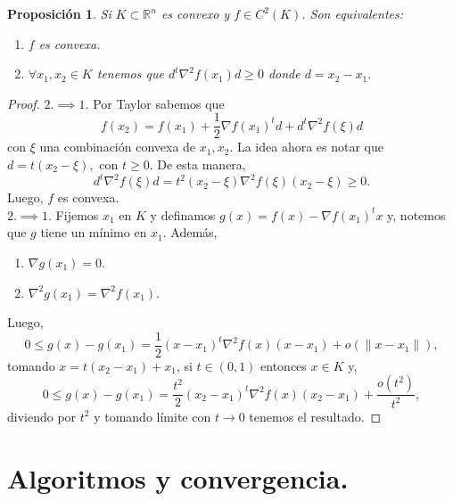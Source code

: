 \documentclass[11pt]{article}
\theoremstyle{ejstyle}
\theoremstyle{ejstyle}
\theoremstyle{ejstyle}
\theoremstyle{ejstyle}
\theoremstyle{ejstyle}
\newtheorem{prop}{Proposición}
\theoremstyle{ejstyle}
\theoremstyle{ejstyle}
\begin{document}
 	\begin{prop}
 		Si $K \subset \mathbb{R}^{n}$ es convexo y $f \in C^{2}(K)$. Son equivalentes:
 		\begin{enumerate}
 			\item $f$ es convexa.
 			\item $\forall x_1, x_2 \in K$ tenemos que $d^{t}\nabla^{2}f(x_1)d \geq 0$ donde $d = x_2 - x_1.$
 		\end{enumerate}
 	\end{prop}
 	
 	\begin{proof}
 		$2. \implies 1.$  Por Taylor sabemos que
 		$$
 		f(x_2) = f(x_1) + \frac{1}{2} \nabla f(x_1)^{t}d +d^{t}\nabla^2 f(\xi)d 
 		$$
 		con $\xi$ una combinación convexa de $x_1, x_2$. La idea ahora es notar que $d = t(x_2 - \xi),$ con $t \geq 0.$ De esta manera,
 		$$
 		d^{t}\nabla^2 f(\xi)d = t^{2} (x_2- \xi)\nabla^2 f(\xi)(x_2 - \xi) \geq 0.
 		$$ 
 		Luego, $f$ es convexa. \\
 		
 		$2. \implies 1.$  Fijemos $x_1$ en $K$ y definamos $g(x) = f(x) - \nabla f(x_1)^t x$ y, notemos que $g$ tiene un mínimo en $x_1$. Además,
 		\begin{enumerate}
 			\item $\nabla g(x_1) = 0$.
 			\item $\nabla^{2} g(x_1) = \nabla^{2} f(x_1).$ 
 		\end{enumerate}
 		Luego, 
 		$$
 		0 \leq g(x) - g(x_1) = \frac{1}{2} (x - x_1) ^{t}\nabla^2 f(x) (x - x_1) + o(\|x - x_1\|),
 		$$
 		tomando $x = t(x_2 - x_1) + x_1$, si $t \in (0, 1)$ entonces $x \in K$ y,
 		$$
 		0 \leq g(x) - g(x_1) = \frac{t^2}{2} (x_2 - x_1) ^{t}\nabla^2 f(x) (x_2 - x_1) + \frac{o(t^2)}{t^2},
 		$$
 		diviendo por $t^2$ y tomando límite con $t \to 0$ tenemos el resultado.
 	\end{proof}
 	
 	\section{Algoritmos y convergencia.}
 	
\end{document}
